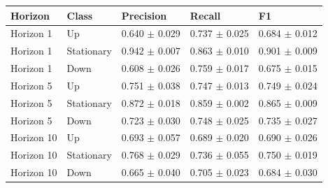 \begin{tabular}{lllll}
\toprule
Horizon & Class & Precision & Recall & F1 \\
\midrule
Horizon 1 & Up & 0.640 $\pm$ 0.029 & 0.737 $\pm$ 0.025 & 0.684 $\pm$ 0.012 \\
Horizon 1 & Stationary & 0.942 $\pm$ 0.007 & 0.863 $\pm$ 0.010 & 0.901 $\pm$ 0.009 \\
Horizon 1 & Down & 0.608 $\pm$ 0.026 & 0.759 $\pm$ 0.017 & 0.675 $\pm$ 0.015 \\
Horizon 5 & Up & 0.751 $\pm$ 0.038 & 0.747 $\pm$ 0.013 & 0.749 $\pm$ 0.024 \\
Horizon 5 & Stationary & 0.872 $\pm$ 0.018 & 0.859 $\pm$ 0.002 & 0.865 $\pm$ 0.009 \\
Horizon 5 & Down & 0.723 $\pm$ 0.030 & 0.748 $\pm$ 0.025 & 0.735 $\pm$ 0.027 \\
Horizon 10 & Up & 0.693 $\pm$ 0.057 & 0.689 $\pm$ 0.020 & 0.690 $\pm$ 0.026 \\
Horizon 10 & Stationary & 0.768 $\pm$ 0.029 & 0.736 $\pm$ 0.055 & 0.750 $\pm$ 0.019 \\
Horizon 10 & Down & 0.665 $\pm$ 0.040 & 0.705 $\pm$ 0.023 & 0.684 $\pm$ 0.030 \\
\bottomrule
\end{tabular}
